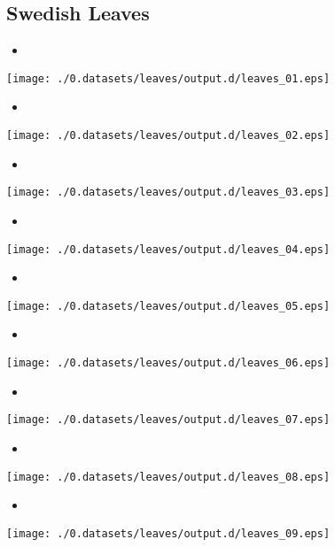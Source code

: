 \documentclass{book}
\begin{document}
\subsection{Swedish Leaves}
\label{sec-3_1_3}


\begin{itemize}
\item 
\end{itemize}
\texttt{[image: ./0.datasets/leaves/output.d/leaves\_01.eps]}

\begin{itemize}
\item 
\end{itemize}
\texttt{[image: ./0.datasets/leaves/output.d/leaves\_02.eps]}

\begin{itemize}
\item 
\end{itemize}
\texttt{[image: ./0.datasets/leaves/output.d/leaves\_03.eps]}

\begin{itemize}
\item 
\end{itemize}
\texttt{[image: ./0.datasets/leaves/output.d/leaves\_04.eps]}

\begin{itemize}
\item 
\end{itemize}
\texttt{[image: ./0.datasets/leaves/output.d/leaves\_05.eps]}

\begin{itemize}
\item 
\end{itemize}
\texttt{[image: ./0.datasets/leaves/output.d/leaves\_06.eps]}

\begin{itemize}
\item 
\end{itemize}
\texttt{[image: ./0.datasets/leaves/output.d/leaves\_07.eps]}

\begin{itemize}
\item 
\end{itemize}
\texttt{[image: ./0.datasets/leaves/output.d/leaves\_08.eps]}

\begin{itemize}
\item 
\end{itemize}
\texttt{[image: ./0.datasets/leaves/output.d/leaves\_09.eps]}
\end{document}
